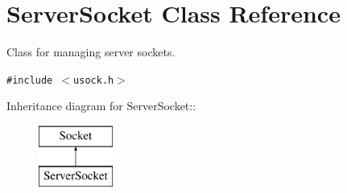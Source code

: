 \hypertarget{classServerSocket}{
\section{ServerSocket Class Reference}
\label{classServerSocket}
}
Class for managing server sockets.  


{\tt \#include $<$usock.h$>$}

Inheritance diagram for ServerSocket::\begin{figure}[H]
\begin{center}
\leavevmode
\includegraphics[height=2cm]{classServerSocket}
\end{center}
\end{figure}
